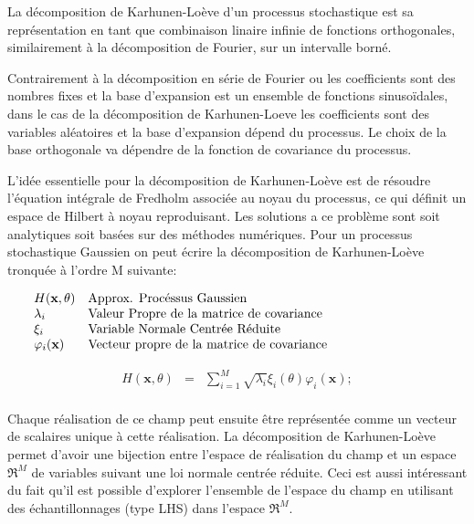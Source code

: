 \documentclass[a4paper,10pt]{article}
\begin{document}
	 La décomposition de Karhunen-Loève d'un processus stochastique est sa représentation en tant que combinaison linaire infinie de fonctions orthogonales, similairement à la décomposition de Fourier, sur un intervalle borné. \par
	 Contrairement à la décomposition en série de Fourier ou les coefficients sont des nombres fixes et la base d'expansion est un ensemble de fonctions sinusoïdales, dans le cas de la décomposition de Karhunen-Loeve les coefficients sont des variables aléatoires et la base d'expansion dépend du processus. Le choix de la base orthogonale va dépendre de la fonction de covariance du processus. \par
	 L'idée essentielle pour la décomposition de Karhunen-Loève est de résoudre l'équation intégrale de Fredholm associée au noyau du processus, ce qui définit un espace de Hilbert à noyau reproduisant. Les solutions a ce problème sont soit analytiques soit basées sur des méthodes numériques. Pour un processus stochastique Gaussien on peut écrire la décomposition de Karhunen-Loève tronquée à l'ordre M suivante:
	 
   \[
      \begin{array}{lp{0.8\linewidth}}
         H(\textbf{x}, \theta) & Approx. Procéssus Gaussien \\
         \lambda_{i}          & Valeur Propre de la matrice de covariance \\
         \xi_{i}             & Variable Normale Centrée Réduite \\
         \varphi_{i}(\textbf{x}) & Vecteur propre de la matrice de covariance
      \end{array}
   \]

   \begin{eqnarray}
H(\textbf{x}, \theta) & = & \sum_{i=1}^{M}\sqrt{\lambda_{i}}\xi_{i}(\theta)\varphi_{i}(\textbf{x});
   \end{eqnarray}\\

Chaque réalisation de ce champ peut ensuite être représentée comme un vecteur de scalaires unique à cette réalisation. La décomposition de Karhunen-Loève permet d'avoir une bijection entre l'espace de réalisation du champ et un espace $\Re^{M}$ de variables suivant une loi normale centrée réduite. Ceci est aussi intéressant du fait qu'il est possible d'explorer l’ensemble de l'espace du champ en utilisant des échantillonnages (type LHS) dans l'espace $\Re^{M}$. \par
\end{document}
